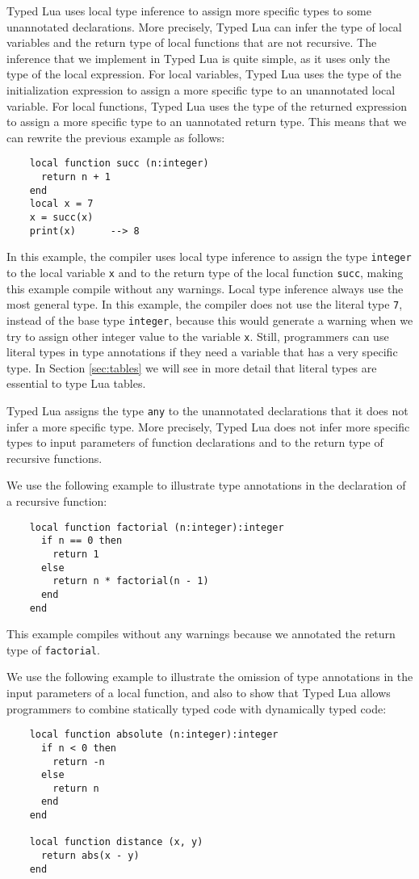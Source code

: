 Typed Lua uses local type inference to assign more specific types to
some unannotated declarations.
More precisely, Typed Lua can infer the type of local variables and
the return type of local functions that are not recursive.
The inference that we implement in Typed Lua is quite simple, as it
uses only the type of the local expression.
For local variables, Typed Lua uses the type of the initialization
expression to assign a more specific type to an unannotated local variable.
For local functions, Typed Lua uses the type of the returned expression
to assign a more specific type to an uannotated return type.
This means that we can rewrite the previous example as follows:
\begin{verbatim}
    local function succ (n:integer)
      return n + 1
    end
    local x = 7
    x = succ(x)
    print(x)      --> 8
\end{verbatim}

In this example, the compiler uses local type inference to assign the
type \texttt{integer} to the local variable \texttt{x} and to the
return type of the local function \texttt{succ}, making this example
compile without any warnings.
Local type inference always use the most general type.
In this example, the compiler does not use the literal type \texttt{7},
instead of the base type \texttt{integer}, because this would generate
a warning when we try to assign other integer value to the variable \texttt{x}.
Still, programmers can use literal types in type annotations if
they need a variable that has a very specific type.
In Section \ref{sec:tables} we will see in more detail that literal
types are essential to type Lua tables.

Typed Lua assigns the type \texttt{any} to the unannotated declarations
that it does not infer a more specific type.
More precisely, Typed Lua does not infer more specific types to input
parameters of function declarations and to the return type of
recursive functions.

We use the following example to illustrate type annotations in the
declaration of a recursive function:
\begin{verbatim}
    local function factorial (n:integer):integer
      if n == 0 then
        return 1
      else
        return n * factorial(n - 1)
      end
    end
\end{verbatim}

This example compiles without any warnings because we annotated
the return type of \texttt{factorial}.

We use the following example to illustrate the omission of type
annotations in the input parameters of a local function,
and also to show that Typed Lua allows programmers to combine
statically typed code with dynamically typed code:
\begin{verbatim}
    local function absolute (n:integer):integer
      if n < 0 then
        return -n
      else
        return n
      end
    end

    local function distance (x, y)
      return abs(x - y)
    end
\end{verbatim}

